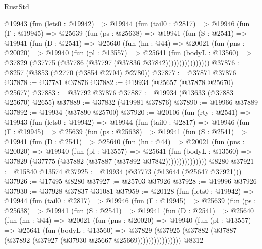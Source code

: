 \begin{lexlean}{RustStd}
\begin{coremodule}
      @19943
        (fun (lets0 : @19942) =>
        @19944
          (fun (tail0 : @2817) =>
          @19946
            (fun (Γ : @19945) =>
            @25639
              (fun (ps : @25638) =>
              @19941
                (fun (S : @2541) =>
                @19941
                  (fun (D : @2541) =>
                  @25640
                    (fun (hn : @44) =>
                    @20021
                      (fun (pns : @20020) =>
                      @19940
                        (fun (pl : @13557) =>
                        @25641
                          (fun (bodyL : @13560) =>
                          @37829 (@37775 (@37786 (@37797 (@37836 @37842))))))))))))))))
@37876 := @8257 (@3853 (@2770 (@3854 @2704) @2780))
@37877 := @37871 @37876
@37878 := @37781 @37876
@37882 := @19934 (@25657 (@37878 @25670) @25677)
@37883 := @37792 @37876
@37887 := @19934 (@13633 (@37883 @25670) @2655)
@37889 := @37832 (@19981 @37876)
@37890 := @19966 @37889
@37892 := @19934 (@37890 @25700)
@37920 := @20106
    (fun (rty : @2541) =>
    @19943
      (fun (lets0 : @19942) =>
      @19944
        (fun (tail0 : @2817) =>
        @19946
          (fun (Γ : @19945) =>
          @25639
            (fun (ps : @25638) =>
            @19941
              (fun (S : @2541) =>
              @19941
                (fun (D : @2541) =>
                @25640
                  (fun (hn : @44) =>
                  @20021
                    (fun (pns : @20020) =>
                    @19940
                      (fun (pl : @13557) =>
                      @25641
                        (fun (bodyL : @13560) =>
                        @37829 (@37775 (@37882 (@37887 (@37892 @37842)))))))))))))))
    @8280
@37921 := @15840 @13574
@37925 := @19934 (@37773 (@13644 (@25647 @37921)))
@37926 := @17495 @8280
@37927 := @25703 @37926
@37928 := @19996 @37926
@37930 := @37928 @37837 @31081
@37959 := @20128
    (fun (lets0 : @19942) =>
    @19944
      (fun (tail0 : @2817) =>
      @19946
        (fun (Γ : @19945) =>
        @25639
          (fun (ps : @25638) =>
          @19941
            (fun (S : @2541) =>
            @19941
              (fun (D : @2541) =>
              @25640
                (fun (hn : @44) =>
                @20021
                  (fun (pns : @20020) =>
                  @19940
                    (fun (pl : @13557) =>
                    @25641
                      (fun (bodyL : @13560) =>
                      @37829
                        (@37925
                          (@37882 (@37887 (@37892 (@37927 (@37930 @25667 @25669))))))))))))))))
    @8312

\end{coremodule}
\end{lexlean}
